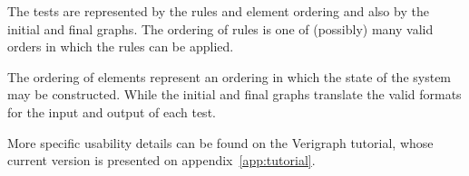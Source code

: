 The tests are represented by the rules and element ordering and also by the initial and final graphs. The ordering of rules is one of (possibly) many valid orders in which the rules can be applied.

The ordering of elements represent an ordering in which the state of the system may be constructed. While the initial and final graphs translate the valid formats for the input and output of each test.

More specific usability details can be found on the Verigraph tutorial, whose current version is presented on appendix~\ref{app:tutorial}.



